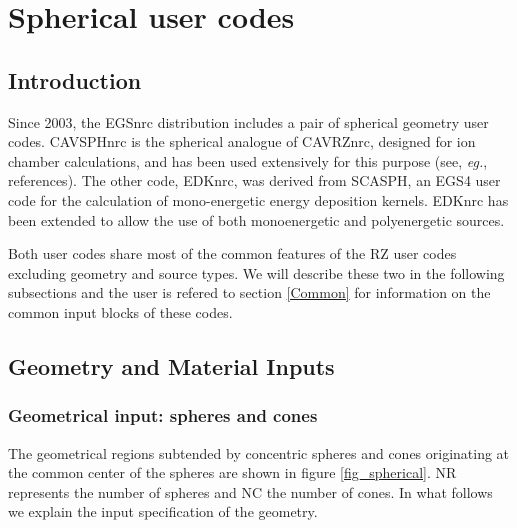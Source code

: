 \documentclass[12pt,twoside]{article}  %
\newcommand{\eg}{{\em eg.}}
\begin{document}
\section{Spherical user codes}

\subsection{Introduction}

Since 2003, the EGSnrc distribution includes a pair of spherical 
geometry user codes. 
CAVSPHnrc is the spherical analogue of CAVRZnrc, designed for ion chamber
calculations, and has been used extensively for this purpose (see, \eg,
references\cite{Bi90b,RT99}). The other code, EDKnrc, was derived from
SCASPH, an EGS4 user code for the calculation of mono-energetic energy
deposition kernels\cite{Ma88}. EDKnrc has been extended to allow the use 
of both monoenergetic and polyenergetic sources.

Both user codes share most of the common features of the RZ user codes
excluding geometry and source types. We will describe these two in the
following subsections and the user is refered to section \ref{Common}
for information on the common input blocks of these codes.

\subsection{Geometry and Material Inputs}

\subsubsection{Geometrical input: spheres and cones}

The geometrical regions subtended by concentric spheres and cones
originating at the common center of the spheres are shown in figure
\ref{fig_spherical}. NR represents the number of spheres and NC the
number of cones. In what follows we explain the input specification of
the geometry.
\end{document}
